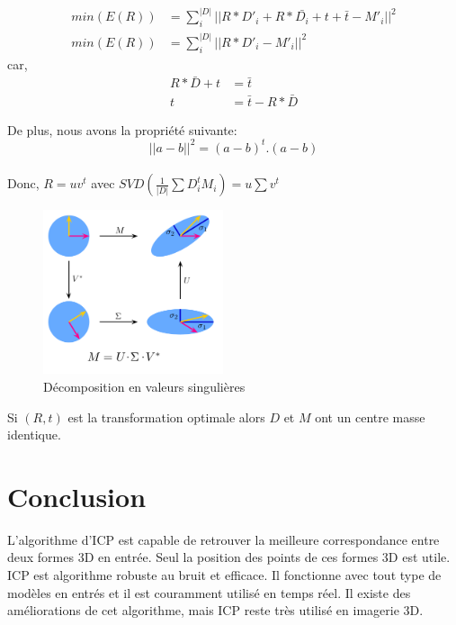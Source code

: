 \documentclass[a4paper,11pt]{article}
\begin{document}
\begin{align}
  min(E(R))&=\sum\limits_i^{|D|} ||R*D'_i+R*\bar{D_i}+t+\bar{t}-M'_i||^2 \\
  min(E(R))&=\sum\limits_i^{|D|} ||R*D'_i-M'_i||^2
\end{align}
car,
\begin{align}
  R*\bar{D}+t &= \bar{t} \\
  t &= \bar{t} - R*\bar{D}
\end{align}

De plus, nous avons la propriété suivante:
\begin{equation}
  ||a-b||^2=(a-b)^t.(a-b)
\end{equation}
\\

Donc, $R=uv^t$ avec $SVD(\frac{1}{|D|}\sum D_i^tM_i) = u\sum v^t$

\begin{figure}[H]
  \begin{center}
    \includegraphics[width=200px]{SingularValueDecomposition.png}
    \caption{Décomposition en valeurs singulières}
  \end{center}
\end{figure}

Si $(R,t)$ est la transformation optimale alors $D$ et $M$ ont un centre 
masse identique.\\

\newpage

\section{Conclusion}

L'algorithme d'ICP est capable de retrouver la meilleure correspondance 
entre deux formes 3D en entrée. Seul la position des points de ces 
formes 3D est utile.\\

ICP est algorithme robuste au bruit et efficace. Il fonctionne avec 
tout type de modèles en entrés et il est couramment utilisé en temps 
réel. Il existe des améliorations de cet algorithme, mais ICP reste 
très utilisé en imagerie 3D.\\



\end{document}
